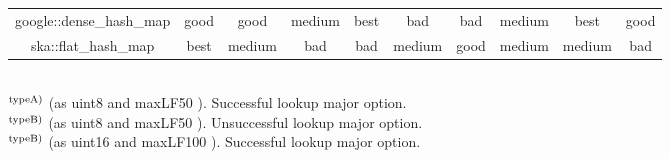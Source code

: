 \begin{table}[hbtp]
\begin{center}
\begin{tabular}{c|c|ccc|ccc|c|c}
        google::dense\_hash\_map                                      & \cellcolor{gray090}good   & \cellcolor{gray090}good   & \cellcolor{gray070}medium & \cellcolor{gray100}best & \cellcolor{gray050}bad    & \cellcolor{gray050}bad    & \cellcolor{gray070}medium & \cellcolor{gray100}best   & \cellcolor{gray090}good \rule[0pt]{0pt}{15pt} \\
        ska::flat\_hash\_map                                          & \cellcolor{gray100}best   & \cellcolor{gray070}medium & \cellcolor{gray050}bad    & \cellcolor{gray050}bad  & \cellcolor{gray070}medium & \cellcolor{gray090}good   & \cellcolor{gray070}medium & \cellcolor{gray070}medium & \cellcolor{gray050}bad  \rule[0pt]{0pt}{15pt} \\ \hline
    \end{tabular}
    \\
    ${\rm ^{typeA)}}$ (as uint8 and maxLF50 ). Successful lookup major option.\\
    ${\rm ^{typeB)}}$ (as uint8 and maxLF50 ). Unsuccessful lookup major option.\\
    ${\rm ^{typeB)}}$ (as uint16 and maxLF100 ). Successful lookup major option.
    \label{table_hashT_cmp}
  \end{center}
\end{table}







